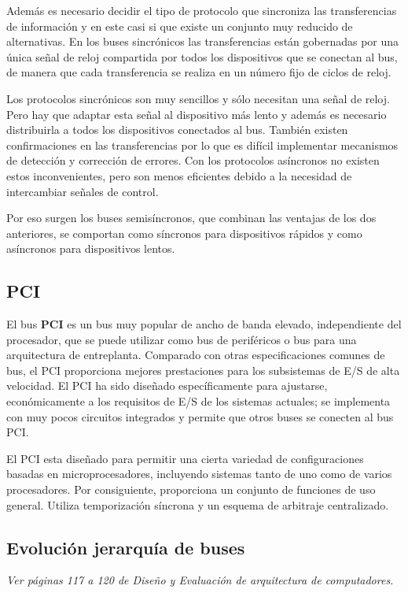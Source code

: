 Además es necesario decidir el tipo de protocolo que sincroniza las transferencias de información y en este casi si que existe un conjunto muy reducido de alternativas. En los buses sincrónicos las transferencias están gobernadas por una única señal de reloj compartida por todos los dispositivos que se conectan al bus, de manera que cada transferencia se realiza en un número fijo de ciclos de reloj.

Los protocolos sincrónicos son muy sencillos y sólo necesitan una señal de reloj. Pero hay que adaptar esta señal al dispositivo más lento y además es necesario distribuirla a todos los dispositivos conectados al bus. También existen confirmaciones en las transferencias por lo que es difícil implementar mecanismos de detección y corrección de errores. Con los protocolos asíncronos no existen estos inconvenientes, pero son menos eficientes debido a la necesidad de intercambiar señales de control.

Por eso surgen los buses semisíncronos, que combinan las ventajas de los dos anteriores, se comportan como síncronos para dispositivos rápidos y como asíncronos para dispositivos lentos.

\subsection{PCI}

El bus \textbf{PCI} es un bus muy popular de ancho de banda elevado, independiente del procesador, que se puede utilizar como bus de periféricos o bus para una arquitectura de entreplanta. Comparado con otras especificaciones comunes de bus, el PCI proporciona mejores prestaciones para los subsistemas de E/S de alta velocidad.  El PCI ha sido diseñado específicamente para ajustarse, económicamente a los requisitos de E/S de los sistemas actuales; se implementa con muy pocos circuitos integrados y permite que otros buses se conecten al bus PCI.\@

El PCI esta diseñado para permitir una cierta variedad de configuraciones basadas en microprocesadores, incluyendo sistemas tanto de uno como de varios procesadores. Por consiguiente, proporciona un conjunto de funciones de uso general. Utiliza temporización síncrona y un esquema de arbitraje centralizado.

\subsection{Evolución jerarquía de buses}

\textit{Ver páginas 117 a 120 de Diseño y Evaluación de arquitectura de computadores.}
